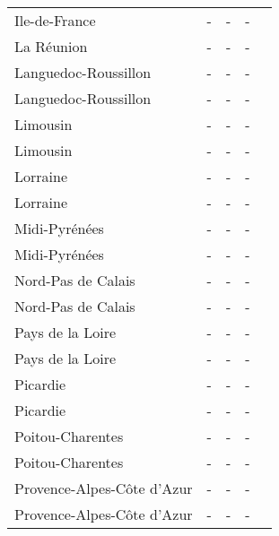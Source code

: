\begin{table}[H]
\begin{tabularx}{\textwidth}{Xcccc}
            Ile-de-France & - & - & - \\
            La Réunion  & - & - & - \\
            Languedoc-Roussillon & - & - & - \\
            Languedoc-Roussillon & - & - & - \\
            Limousin & - & - & - \\
            Limousin & - & - & - \\
            Lorraine & - & - & - \\
            Lorraine & - & - & - \\
            Midi-Pyrénées & - & - & - \\
            Midi-Pyrénées & - & - & - \\
            Nord-Pas de Calais & - & - & - \\
            Nord-Pas de Calais & - & - & - \\
            Pays de la Loire & - & - & - \\
            Pays de la Loire & - & - & - \\
            Picardie & - & - & - \\
            Picardie & - & - & - \\
            Poitou-Charentes & - & - & - \\
            Poitou-Charentes & - & - & - \\
            Provence-Alpes-Côte d’Azur & - & - & - \\
            Provence-Alpes-Côte d’Azur & - & - & - \\
        \bottomrule
    \end{tabularx}
\end{table}
    